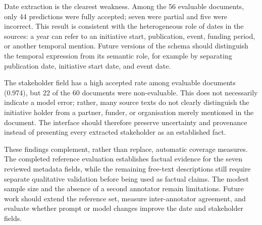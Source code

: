 Date extraction is the clearest weakness. Among the 56 evaluable documents,
only 44 predictions were fully accepted; seven were partial and five were
incorrect. This result is consistent with the heterogeneous role of dates in
the sources: a year can refer to an initiative start, publication, event,
funding period, or another temporal mention. Future versions of the schema
should distinguish the temporal expression from its semantic role, for example
by separating publication date, initiative start date, and event date.

The stakeholder field has a high accepted rate among evaluable documents
(0.974), but 22 of the 60 documents were non-evaluable. This does not
necessarily indicate a model error; rather, many source texts do not clearly
distinguish the initiative holder from a partner, funder, or organisation merely
mentioned in the document. The interface should therefore preserve uncertainty
and provenance instead of presenting every extracted stakeholder as an
established fact.

These findings complement, rather than replace, automatic coverage measures.
The completed reference evaluation establishes factual evidence for the seven
reviewed metadata fields, while the remaining free-text descriptions still
require separate qualitative validation before being used as factual claims.
The modest sample size and the absence of a second annotator remain limitations.
Future work should extend the reference set, measure inter-annotator agreement,
and evaluate whether prompt or model changes improve the date and stakeholder
fields.
